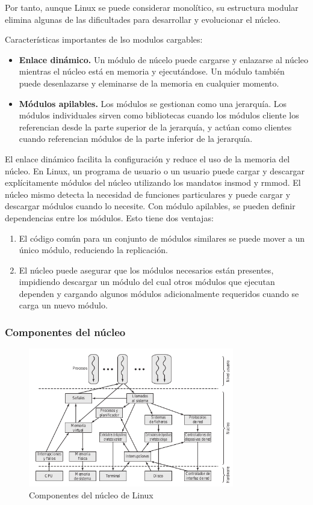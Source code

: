 \documentclass{article}
\begin{document}
				Por tanto, aunque Linux se puede considerar monolítico, su estructura modular elimina algunas de las dificultades para desarrollar y evolucionar el núcleo.
				
				Características importantes de lso modulos cargables:
				\begin{itemize}
				\item \textbf{Enlace dinámico.} Un módulo de núcelo puede cargarse y enlazarse al núcleo mientras el núcleo está en memoria y ejecutándose. Un módulo también puede desenlazarse y eleminarse de la memoria en cualquier momento.
				\item \textbf{Módulos apilables.} Los módulos se gestionan como una jerarquía. Los módulos individuales sirven como bibliotecas cuando los módulos cliente los referencian desde la parte superior de la jerarquía, y actúan como clientes cuando referencian módulos de la parte inferior de la jerarquía.
				\end{itemize}
				 					
				El enlace dinámico facilita la configuración y reduce el uso de la memoria del núcleo. En Linux, un programa de usuario o un usuario puede cargar y descargar explícitamente módulos del núcleo utilizando los mandatos insmod y rmmod. El núcleo mismo detecta la necesidad de funciones particulares y puede cargar y descargar módulos cuando lo necesite. Con módulo apilables, se pueden definir dependencias entre los módulos. Esto tiene dos ventajas: 
				 
				\begin{enumerate}
				\item El código común para un conjunto de módulos similares se puede mover a un único módulo, reduciendo la replicación.
				\item El núcleo puede asegurar que los módulos necesarios están presentes, impidiendo descargar un módulo del cual otros módulos que ejecutan dependen y cargando algunos módulos adicionalmente requeridos cuando se carga un nuevo módulo.
				\end{enumerate}
				
			\subsubsection{Componentes del núcleo}
				\begin{figure}
				\caption{Componentes del núcleo de Linux}
				\label{figura26:componentes_nucleo}
				\centering
				\includegraphics[width=0.8\textwidth, scale=1]{figura26.png}
				\end{figure}
				
\end{document}
